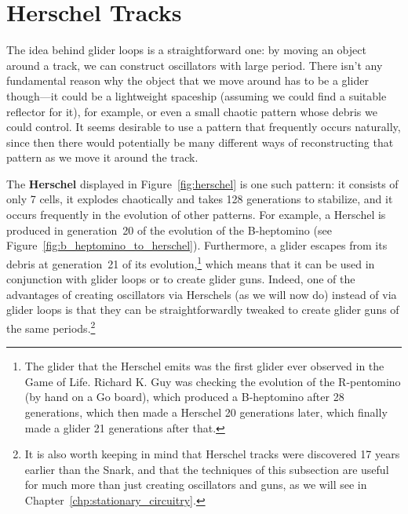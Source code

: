 
\section{Herschel Tracks}\label{sec:herschel_track}

The idea behind glider loops is a straightforward one: by moving an object around a track, we can construct oscillators with large period. There isn't any fundamental reason why the object that we move around has to be a glider though---it could be a lightweight spaceship (assuming we could find a suitable reflector for it), for example, or even a small chaotic pattern whose debris we could control. It seems desirable to use a pattern that frequently occurs naturally, since then there would potentially be many different ways of reconstructing that pattern as we move it around the track.

The \textbf{Herschel} displayed in Figure~\ref{fig:herschel} is one such pattern: it consists of only 7 cells, it explodes chaotically and takes 128 generations to stabilize, and it occurs frequently in the evolution of other patterns. For example, a Herschel is produced in generation~20 of the evolution of the B-heptomino (see Figure~\ref{fig:b_heptomino_to_herschel}). Furthermore, a glider escapes from its debris at generation~21 of its evolution,\footnote{The glider that the Herschel emits was the first glider ever observed in the Game of Life. Richard K. Guy was checking the evolution of the R-pentomino (by hand on a Go board), which produced a B-heptomino after 28 generations, which then made a Herschel 20 generations later, which finally made a glider 21 generations after that.} which means that it can be used in conjunction with glider loops or to create glider guns. Indeed, one of the advantages of creating oscillators via Herschels (as we will now do) instead of via glider loops is that they can be straightforwardly tweaked to create glider guns of the same periods.\footnote{It is also worth keeping in mind that Herschel tracks were discovered 17 years earlier than the Snark, and that the techniques of this subsection are useful for much more than just creating oscillators and guns, as we will see in Chapter~\ref{chp:stationary_circuitry}.}

